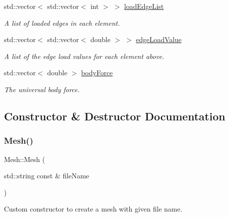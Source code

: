 \begin{DoxyCompactItemize}
\mbox{\label{class_mesh_a918281e8de6ff4f38e017c99a55fd8bf}} 
std\+::vector$<$ std\+::vector$<$ int $>$ $>$ \mbox{\hyperlink{class_mesh_a918281e8de6ff4f38e017c99a55fd8bf}{load\+Edge\+List}}
\begin{DoxyCompactList}\small\item\em A list of loaded edges in each element. \end{DoxyCompactList}\item 
\mbox{\label{class_mesh_aa94755c6ec3631b14f93a1ca48c5d366}} 
std\+::vector$<$ std\+::vector$<$ double $>$ $>$ \mbox{\hyperlink{class_mesh_aa94755c6ec3631b14f93a1ca48c5d366}{edge\+Load\+Value}}
\begin{DoxyCompactList}\small\item\em A list of the edge load values for each element above. \end{DoxyCompactList}\item 
\mbox{\label{class_mesh_a10891b16424fd1015868d2ef9a2c9311}} 
std\+::vector$<$ double $>$ \mbox{\hyperlink{class_mesh_a10891b16424fd1015868d2ef9a2c9311}{body\+Force}}
\begin{DoxyCompactList}\small\item\em The universal body force. \end{DoxyCompactList}\end{DoxyCompactItemize}


\subsection{Constructor \& Destructor Documentation}
\mbox{\label{class_mesh_af9ff79e2003cfde74b16266cd8113acf}} 
\subsubsection{\texorpdfstring{Mesh()}{Mesh()}}
{\footnotesize\ttfamily Mesh\+::\+Mesh (\begin{DoxyParamCaption}\item[{std\+::string const \&}]{file\+Name }\end{DoxyParamCaption})}



Custom constructor to create a mesh with given file name. 


